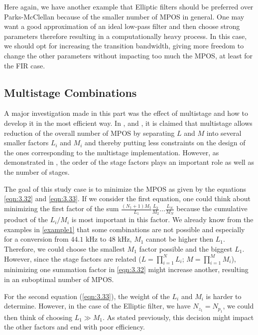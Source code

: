 Here again, we have another example that Elliptic filters should be preferred over Parks-McClellan because of the smaller number of MPOS in general. One may want a good approximation of an ideal low-pass filter 	and then choose strong parameters therefore resulting in a computationally heavy process. In this case, we should opt for increasing the transition bandwidth, giving more freedom to change the other parameters without impacting too much the MPOS, at least for the FIR case.   


\subsection{Multistage Combinations}\label{section 3.2.2}
A major investigation made in this part was the effect of multistage and how to develop it in the most efficient way. In \cite{Proakis}, \cite{vaidyanathan} and \cite{Oppenheim}, it is claimed that multistage allows reduction of the overall number of MPOS by separating $L$ and $M$ into several smaller factors $L_i$ and $M_i$ and thereby putting less constraints on the design of the ones corresponding to the multistage implementation. However, as demonstrated in \cite{turek}, the order of the stage factors plays an important role as well as the number of stages. 

The goal of this study case is to minimize the MPOS as given by the equations \ref{eqn:3.32} and \ref{eqn:3.33}. If we consider the first equation, one could think about minimizing the first factor of the sum $\frac{(N_1 + 1)M_1}{L_1} \frac{L_2}{M_2}\dots\frac{L_N}{M_N}$  because the cumulative product of the $L_i/M_i$ is most important in this factor. We already know from the examples in \ref{example1} that some combinations are not possible and especially for a conversion from $44.1$ kHz to $48$ kHz, $M_1$ cannot be higher then $L_1$. Therefore, we could choose the smallest $M_1$ factor possible and the biggest $L_1$. However, since the stage factors are related ($L = \prod_{i=1}^{N}L_i$; $M = \prod_{i=1}^{M}M_i$), minimizing one summation factor in \ref{eqn:3.32} might increase another, resulting in an suboptimal number of MPOS. 

For the second equation (\ref{eqn:3.33}), the weight of the $L_i$ and $M_i$ is harder to determine. However, in the case of the Elliptic filter, we have $N_{z_1} = N_{p_1}$, we could then think of choosing $L_1 \gg M_1$. As stated previously, this decision might impact the other factors and end with poor efficiency.\\


